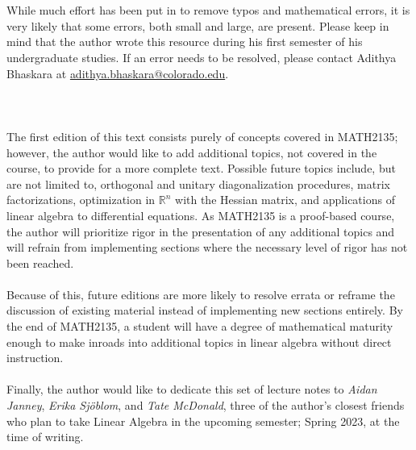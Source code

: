 \vphantom
\\
\\
While much effort has been put in to remove typos and mathematical errors, it is very likely that some errors, both small and large, are present. Please keep in mind that the author wrote this resource during his first semester of his undergraduate studies. If an error needs to be resolved, please contact Adithya Bhaskara at \href{mailto:adithya.bhaskara@colorado.edu}{adithya.bhaskara@colorado.edu}.
\\
\\
\pagebreak
\\
\\
The first edition of this text consists purely of concepts covered in MATH2135; however, the author would like to add additional topics, not covered in the course, to provide for a more complete text. Possible future topics include, but are not limited to, orthogonal and unitary diagonalization procedures, matrix factorizations, optimization in \(\mathbb{R}^n\) with the Hessian matrix, and applications of linear algebra to differential equations. As MATH2135 is a proof-based course, the author will prioritize rigor in the presentation of any additional topics and will refrain from implementing sections where the necessary level of rigor has not been reached.
\\
\\
Because of this, future editions are more likely to resolve errata or reframe the discussion of existing material instead of implementing new sections entirely. By the end of MATH2135, a student will have a degree of mathematical maturity enough to make inroads into additional topics in linear algebra without direct instruction.
\\
\\
Finally, the author would like to dedicate this set of lecture notes to \textit{Aidan Janney}, \textit{Erika Sj\"{o}blom}, and \textit{Tate McDonald}, three of the author's closest friends who plan to take Linear Algebra in the upcoming semester; Spring 2023, at the time of writing.
\\
\\
\vfill
{}